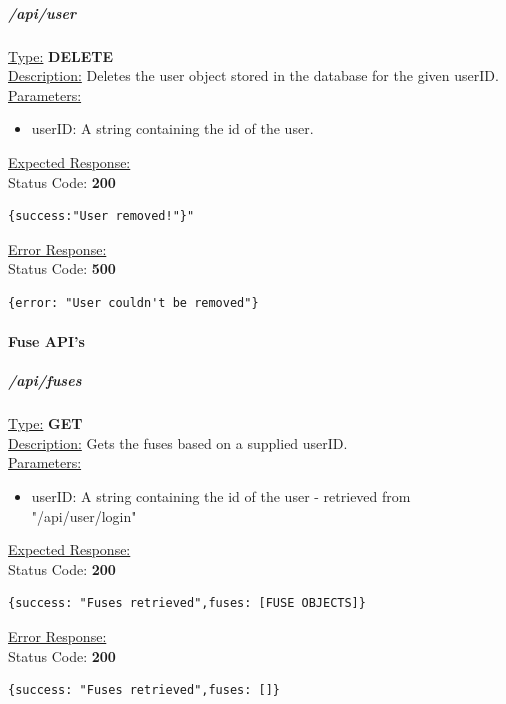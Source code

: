 \documentclass[preprint,12pt,3p]{elsarticle}
\newcommand{\forceindent}{\leavevmode{\parindent=1em\indent}}
\begin{document}
\subparagraph*{/api/user}
\underline{Type:} \textbf{DELETE}\\

\underline{Description:} Deletes the user object stored in the database for the given userID.\\

\underline{Parameters:}
\begin{itemize}
\item userID: A string containing the id of the user.
\end{itemize}

\underline{Expected Response:}\\[5pt]
\forceindent Status Code: \textbf{200} \\
\begin{verbatim}
{success:"User removed!"}"
\end{verbatim}
\underline{Error Response:}\\[5pt]
\forceindent Status Code: \textbf{500} \\
\begin{verbatim}
{error: "User couldn't be removed"}
\end{verbatim}



\paragraph{Fuse API's}
\subparagraph*{/api/fuses}
\underline{Type:} \textbf{GET}\\

\underline{Description:} Gets the fuses based on a supplied userID.\\

\underline{Parameters:}
\begin{itemize}
\item userID: A string containing the id of the user - retrieved from "/api/user/login"
\end{itemize}
\underline{Expected Response:}\\[5pt]
\forceindent Status Code: \textbf{200} \\
\begin{verbatim}
{success: "Fuses retrieved",fuses: [FUSE OBJECTS]}
\end{verbatim}
\underline{Error Response:}\\[5pt]
\forceindent Status Code: \textbf{200} \\
\begin{verbatim}
{success: "Fuses retrieved",fuses: []}
\end{verbatim}
\end{document}
